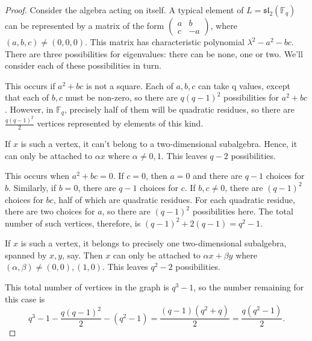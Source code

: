 \documentclass[11pt]{amsart}
\theoremstyle{plain}
\newtheorem{theorem}{Theorem}[section]
\def\F{\mathbb{F}}
\begin{document}

\begin{proof}  
Consider the algebra acting on itself. A typical element of $L=\mathfrak{sl}_2(\F_q)$ can be represented by a matrix of the form $\left(\begin{matrix} a&b\\c&-a\end{matrix}\right)$, where $(a,b,c)\neq (0,0,0)$. This matrix has characteristic polynomial $\lambda^2-a^2-bc$. There are three possibilities for eigenvalues: there can be none, one or two. We'll consider each of these possibilities in turn.
\medskip

 This occurs if $a^2+bc$ is not a square. Each of $a,b,c$ can take q values, except that each of $b,c$ must be non-zero, so there are $q(q-1)^2$ possibilities for $a^2+bc$. However, in $\F_q$, precisely half of them will be quadratic residues, so there are $\frac{q(q-1)^2}{2}$ vertices represented by elements of this kind.
\par

If $x$ is such a vertex, it can't belong to a two-dimensional subalgebra. Hence, it can only be attached to $\alpha x$ where $\alpha\neq 0,1$. This leaves $q-2$ possibilities.
\medskip

 This occurs when $a^2+bc=0$. If $c=0$, then $a=0$ and there are $q-1$ choices for $b$. Similarly, if $b=0$, there are $q-1$ choices for $c$. If $b,c\neq 0$, there are $(q-1)^2$ choices for $bc$, half of which are quadratic residues. For each quadratic residue, there are two choices for $a$, so there are $(q-1)^2$ possibilities here. The total number of such vertices, therefore, is $(q-1)^2+2(q-1)=q^2-1$.
\par

If $x$ is such a vertex, it belongs to precisely one two-dimensional subalgebra, spanned by $x,y$, say. Then $x$ can only be attached to $\alpha x+\beta y$ where $(\alpha, \beta)\neq (0,0), (1,0)$. This leaves $q^2-2$ possibilities.
\medskip

 This total number of vertices in the graph is $q^3-1$, so the number remaining for this case is $$q^3-1-\frac{q(q-1)^2}{2}-(q^2-1)=\frac{(q-1)(q^2+q)}{2}=\frac{q(q^2-1)}{2}.$$
\par


\end{proof}
\end{document}
